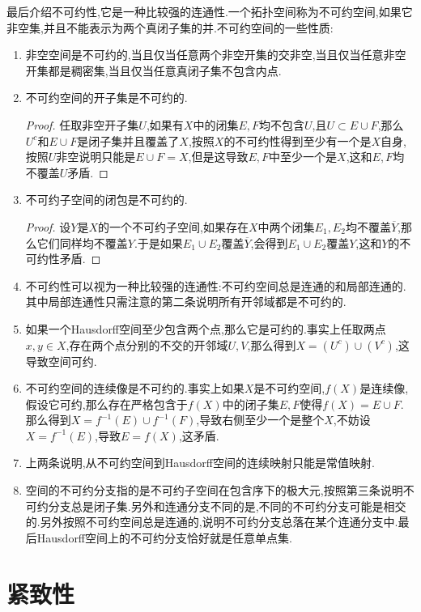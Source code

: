 最后介绍不可约性,它是一种比较强的连通性.一个拓扑空间称为不可约空间,如果它非空集,并且不能表示为两个真闭子集的并.不可约空间的一些性质:
\begin{enumerate}
	\item 非空空间是不可约的,当且仅当任意两个非空开集的交非空,当且仅当任意非空开集都是稠密集,当且仅当任意真闭子集不包含内点.
	\item 不可约空间的开子集是不可约的.
	\begin{proof}
		
		任取非空开子集$U$,如果有$X$中的闭集$E,F$均不包含$U$,且$U\subset E\cup F$,那么$U^c$和$E\cup F$是闭子集并且覆盖了$X$,按照$X$的不可约性得到至少有一个是$X$自身,按照$U$非空说明只能是$E\cup F=X$,但是这导致$E,F$中至少一个是$X$,这和$E,F$均不覆盖$U$矛盾.
	\end{proof}
	\item 不可约子空间的闭包是不可约的.
	\begin{proof}
		
		设$Y$是$X$的一个不可约子空间,如果存在$X$中两个闭集$E_1,E_2$均不覆盖$\overline{Y}$,那么它们同样均不覆盖$Y$.于是如果$E_1\cup E_2$覆盖$\overline{Y}$,会得到$E_1\cup E_2$覆盖$Y$,这和$Y$的不可约性矛盾.
	\end{proof}
	\item 不可约性可以视为一种比较强的连通性:不可约空间总是连通的和局部连通的.其中局部连通性只需注意的第二条说明所有开邻域都是不可约的.
	\item 如果一个Hausdorff空间至少包含两个点,那么它是可约的.事实上任取两点$x,y\in X$,存在两个点分别的不交的开邻域$U,V$,那么得到$X=(U^c)\cup (V^c)$,这导致空间可约.
	\item 不可约空间的连续像是不可约的.事实上如果$X$是不可约空间,$f(X)$是连续像,假设它可约,那么存在严格包含于$f(X)$中的闭子集$E,F$使得$f(X)=E\cup F$.那么得到$X=f^{-1}(E)\cup f^{-1}(F)$,导致右侧至少一个是整个$X$,不妨设$X=f^{-1}(E)$,导致$E=f(X)$,这矛盾.
	\item 上两条说明,从不可约空间到Hausdorff空间的连续映射只能是常值映射.
	\item 空间的不可约分支指的是不可约子空间在包含序下的极大元,按照第三条说明不可约分支总是闭子集.另外和连通分支不同的是,不同的不可约分支可能是相交的.另外按照不可约空间总是连通的,说明不可约分支总落在某个连通分支中.最后Hausdorff空间上的不可约分支恰好就是任意单点集.
\end{enumerate}
\newpage
\section{紧致性}

